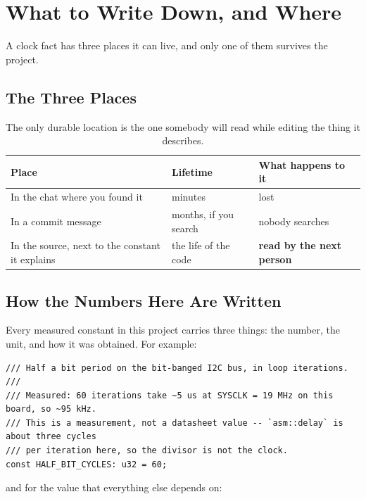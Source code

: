 \section{What to Write Down, and Where}
\label{sec:clocks-write-down}

A clock fact has three places it can live, and only one of them survives the project.

\subsection{The Three Places}

\begin{table}[htbp]
    \centering
    \footnotesize
    \begin{tabular}{@{}p{}p{}p{}@{}}
        \toprule
        \textbf{Place} & \textbf{Lifetime} & \textbf{What happens to it} \\
        \midrule
        In the chat where you found it & minutes & lost \\
        In a commit message & months, if you search & nobody searches \\
        In the source, next to the constant it explains & the life of the code & \textbf{read by the next person} \\
        \bottomrule
    \end{tabular}
    \caption{The only durable location is the one somebody will read while editing the thing it
    describes.}
    \label{tab:where-facts-live}
\end{table}

\subsection{How the Numbers Here Are Written}

Every measured constant in this project carries three things: the number, the unit, and how it was
obtained. For example:

\begin{verbatim}
/// Half a bit period on the bit-banged I2C bus, in loop iterations.
///
/// Measured: 60 iterations take ~5 us at SYSCLK = 19 MHz on this board, so ~95 kHz.
/// This is a measurement, not a datasheet value -- `asm::delay` is about three cycles
/// per iteration here, so the divisor is not the clock.
const HALF_BIT_CYCLES: u32 = 60;
\end{verbatim}

and for the value that everything else depends on:

